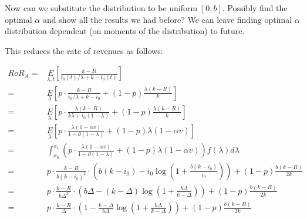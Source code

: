 \begin{comment}
Thus we have shown that for all $\theta$, $g(b,\theta) = 0$ as $b \to 0$ and that for all $\theta$ and $0 < b \leq 1$, $g(b,\theta)$ is decreasing. 
These together mean that for all $\theta$ and $b \in [0,1]$, $g(b,\theta) \leq 0$. 
Which implies that $f'(\theta) \le 0$ for all $\theta$ in the domain.
So to maximize $f$, we need to minimize $\theta$.

Observe that minimizing $\theta = \frac{k}{\Delta}$ is equivalent to minimizing the influence zone.
As shown in Remark~\ref{rem:inf_zone}, this happens at $k = \frac{e}{\alpha(1-\beta)}$. 
{\nolan I think the reason this proof works is more subtle than this. Remember that $\theta$ still depends on $\alpha$ (through $R$). So when we say the integrand is maximized when $\theta$ is maximized, it is also because maximizing $\theta$ still leaves a free variable - it only keeps $\alpha k = e/(1-\beta)$, and $\alpha$ is still free to be optimized in the integrand.}

\endproof

\end{comment}

{\arpit Now can we substitute the distribution to be uniform $[0,b]$. Possibly find the optimal $\alpha$ and show all the results we had before? We can leave finding optimal $\alpha$ distribution dependent (on moments of the distribution) to future.}

 This reduces the rate of revenues as follows:

\begin{align*}
RoR_A =& \underset{\lambda, t}E\left[\frac{k-R}{i_0(t)/\lambda + k - i_0(t)}\right]\\
                                       =& \underset{\lambda}E\left[p\cdot\frac{k-R}{i_0/\lambda + k - i_0} + (1-p)\frac{\lambda(k-R)}{k}\right]\\
                                       =& \underset{\lambda}E\left[p\cdot\frac{\lambda(k-R)}{k\lambda + i_0(1-\lambda)} + (1-p)\frac{\lambda(k-R)}{k}\right]\\
                                       =& \underset{\lambda}E\left[p\cdot\frac{\lambda(1-\alpha v)}{1-\theta(1-\lambda)} + (1-p)\lambda (1-\alpha v)\right]\\
                                       =& \int_{x_0}^{x_1} \left(p\cdot\frac{\lambda(1-\alpha v)}{1-\theta(1-\lambda)} + (1-p)\lambda (1-\alpha v)\right) f(\lambda) d\lambda\\
                                       =& p\cdot\frac{k-R}{b(k-i_0)^2}\cdot\left(b(k-i_0) - i_0 \log\left(1 + \frac{b(k-i_0)}{i_0}\right)\right) + (1-p)\frac{b(k-R)}{2k}\\
                                       =& p\cdot\frac{k-R}{b\Delta^2}\cdot\left(b\Delta - (k-\Delta)\log\left(1+\frac{b\Delta}{k-\Delta}\right)\right) + (1-p)\frac{b(k-R)}{2k}\\
                                       =& p\cdot\frac{k-R}{\Delta}\cdot\left(1 - \frac{k-\Delta}{b\Delta}\log\left(1+\frac{b\Delta}{k-\Delta}\right)\right) + (1-p)\frac{b(k-R)}{2k}
\end{align*}

